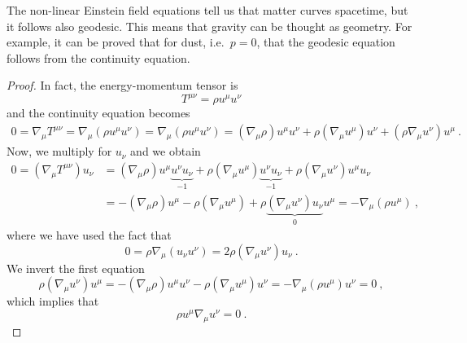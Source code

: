     The non-linear Einstein field equations tell us that matter curves spacetime, but it follows also geodesic. This means that gravity can be thought as geometry. For example, it can be proved that for dust, i.e.~$p=0$, that the geodesic equation follows from the continuity equation. 
    \begin{proof}
        In fact, the energy-momentum tensor is
        \begin{equation*}
            T^{\mu\nu} = \rho u^\mu u^\nu 
        \end{equation*}
        and the continuity equation becomes 
        \begin{equation*}
        \begin{aligned}
            0 = \nabla_\mu T^{\mu\nu} = \nabla_\mu (\rho u^\mu u^\nu) = \nabla_\mu (\rho u^\mu u^\nu) = (\nabla_\mu \rho) u^\mu u^\nu + \rho (\nabla_\mu u^\mu) u^\nu + (\rho \nabla_\mu u^\nu) u^\mu ~.
        \end{aligned}
        \end{equation*}     
        Now, we multiply for $u_\nu$ and we obtain 
        \begin{equation*}
        \begin{aligned}
            0 = (\nabla_\mu T^{\mu\nu}) u_\nu & = (\nabla_\mu \rho) u^\mu \underbrace{u^\nu u_\nu}_{-1} + \rho (\nabla_\mu u^\mu) \underbrace{u^\nu u_\nu}_{-1} + \rho (\nabla_\mu u^\nu) u^\mu u_\nu \\ & = - (\nabla_\mu \rho) u^\mu - \rho (\nabla_\mu u^\mu) + \rho \underbrace{(\nabla_\mu u^\nu) u_\nu}_0 u^\mu = - \nabla_\mu (\rho u^\mu) ~,
        \end{aligned}
        \end{equation*}
        where we have used the fact that
        \begin{equation*}
            0 = \rho \nabla_\mu (u_\nu u^\nu) = 2 \rho (\nabla_\mu u^\nu) u_\nu ~.
        \end{equation*}
        We invert the first equation  
        \begin{equation*}
            \rho (\nabla_\mu u^\nu) u^\mu = - (\nabla_\mu \rho) u^\mu u^\nu - \rho (\nabla_\mu u^\mu) u^\nu = - \nabla_\mu (\rho u^\mu) u^\nu = 0 ~,
        \end{equation*}
        which implies that
        \begin{equation*}
            \rho u^\mu \nabla_\mu u^\nu = 0 ~.
        \end{equation*}
    \end{proof}


